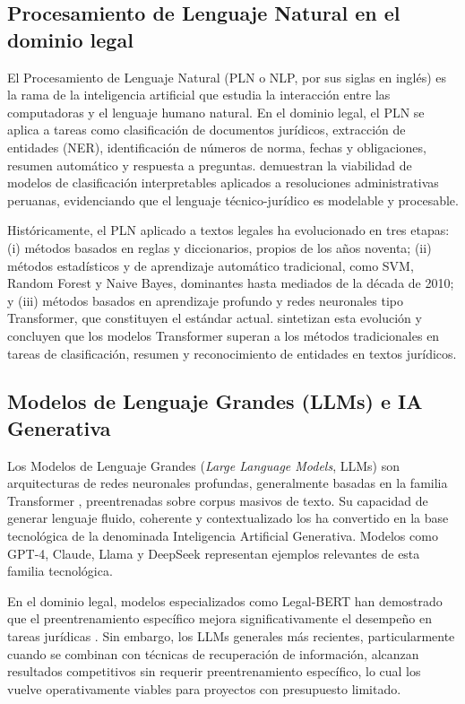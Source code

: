 \documentclass[12pt,a4paper,oneside]{report}
\begin{document}
\subsection{Procesamiento de Lenguaje Natural en el dominio legal}\label{subsec:pln-dominio-legal}

El Procesamiento de Lenguaje Natural (PLN o NLP, por sus siglas en inglés) es la rama de la inteligencia artificial que estudia la interacción entre las computadoras y el lenguaje humano natural. En el dominio legal, el PLN se aplica a tareas como clasificación de documentos jurídicos, extracción de entidades (NER), identificación de números de norma, fechas y obligaciones, resumen automático y respuesta a preguntas. \textcite{alcantarafrancia2024} demuestran la viabilidad de modelos de clasificación interpretables aplicados a resoluciones administrativas peruanas, evidenciando que el lenguaje técnico-jurídico es modelable y procesable.

Históricamente, el PLN aplicado a textos legales ha evolucionado en tres etapas: (i) métodos basados en reglas y diccionarios, propios de los años noventa; (ii) métodos estadísticos y de aprendizaje automático tradicional, como SVM, Random Forest y Naive Bayes, dominantes hasta mediados de la década de 2010; y (iii) métodos basados en aprendizaje profundo y redes neuronales tipo Transformer, que constituyen el estándar actual. \textcite{noronha2025} sintetizan esta evolución y concluyen que los modelos Transformer superan a los métodos tradicionales en tareas de clasificación, resumen y reconocimiento de entidades en textos jurídicos.

\subsection{Modelos de Lenguaje Grandes (LLMs) e IA Generativa}\label{subsec:llm-ia-generativa}

Los Modelos de Lenguaje Grandes (\textit{Large Language Models}, LLMs) son arquitecturas de redes neuronales profundas, generalmente basadas en la familia Transformer \parencite{vaswani2017}, preentrenadas sobre corpus masivos de texto. Su capacidad de generar lenguaje fluido, coherente y contextualizado los ha convertido en la base tecnológica de la denominada Inteligencia Artificial Generativa. Modelos como GPT-4, Claude, Llama y DeepSeek representan ejemplos relevantes de esta familia tecnológica.

En el dominio legal, modelos especializados como Legal-BERT han demostrado que el preentrenamiento específico mejora significativamente el desempeño en tareas jurídicas \parencite{chalkidis2020}. Sin embargo, los LLMs generales más recientes, particularmente cuando se combinan con técnicas de recuperación de información, alcanzan resultados competitivos sin requerir preentrenamiento específico, lo cual los vuelve operativamente viables para proyectos con presupuesto limitado.
\end{document}
